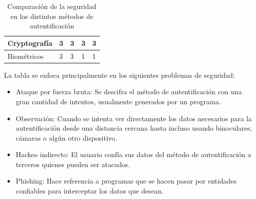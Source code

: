 \documentclass[12pt, a4paper, titlepage]{article}
\begin{document}
\begin{table}[H]
{\begin{tabular}{l|l|l|l|l|}
					\multicolumn{1}{|l|}{Cryptografía}                                                     & 3                                                                 & 3           & 3                                                          & 3        \\ \hline
					\multicolumn{1}{|l|}{Biométricos}                                                      & 3                                                                 & 3           & 1                                                          & 1        \\ \hline
				\end{tabular}
			}
			\caption{Comparación de la seguridad en los distintos métodos de autentificación}
		\end{table}
		La tabla se enfoca principalmente en los siguientes problemas de seguridad: 
		
		\begin{itemize}
			\item Ataque por fuerza bruta: Se descifra el método de autentificación con una gran cantidad de intentos, usualmente generados por un programa.
			\item Observación: Cuando se intenta ver directamente los datos necesarios para la autentificación desde una distancia cercana hasta incluso usando binoculares, cámaras o algún otro dispositivo.
			\item Hackeo indirecto: El usuario confía sus datos del método de autentificación a terceros quienes pueden ser atacados. 
			\item Phishing: Hace referencia a programas que se hacen pasar por entidades confiables para interceptar los datos que desean.
		\end{itemize}
		
\end{document}
